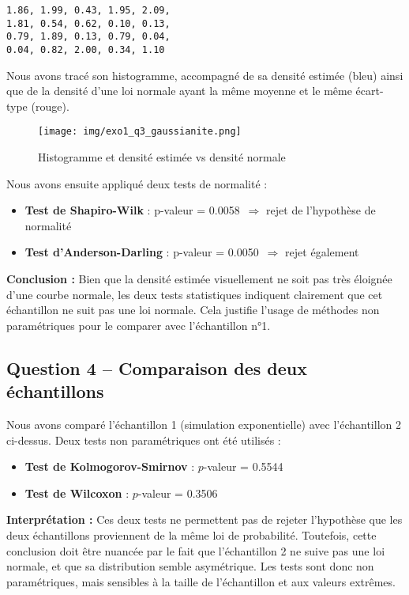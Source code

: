 \documentclass[a4paper,11pt]{article}
\begin{document}
\begin{verbatim}
1.86, 1.99, 0.43, 1.95, 2.09,
1.81, 0.54, 0.62, 0.10, 0.13,
0.79, 1.89, 0.13, 0.79, 0.04,
0.04, 0.82, 2.00, 0.34, 1.10
\end{verbatim}

Nous avons tracé son histogramme, accompagné de sa densité estimée (bleu) ainsi que de la densité d’une loi normale ayant la même moyenne et le même écart-type (rouge).

\begin{figure}[H]
    \centering
    \texttt{[image: img/exo1\_q3\_gaussianite.png]}
    \caption{Histogramme et densité estimée vs densité normale}
\end{figure}

Nous avons ensuite appliqué deux tests de normalité :
\begin{itemize}
    \item \textbf{Test de Shapiro-Wilk} : p-valeur = 0.0058~$\Rightarrow$ rejet de l’hypothèse de normalité
    \item \textbf{Test d’Anderson-Darling} : p-valeur = 0.0050~$\Rightarrow$ rejet également
\end{itemize}

\textbf{Conclusion :} Bien que la densité estimée visuellement ne soit pas très éloignée d’une courbe normale, les deux tests statistiques indiquent clairement que cet échantillon ne suit pas une loi normale. Cela justifie l’usage de méthodes non paramétriques pour le comparer avec l’échantillon n°1.

\subsection*{Question 4 – Comparaison des deux échantillons}
Nous avons comparé l’échantillon 1 (simulation exponentielle) avec l’échantillon 2 ci-dessus. Deux tests non paramétriques ont été utilisés :
\begin{itemize}
    \item \textbf{Test de Kolmogorov-Smirnov} : $p$-valeur = 0.5544
    \item \textbf{Test de Wilcoxon} : $p$-valeur = 0.3506
\end{itemize}

\textbf{Interprétation :} Ces deux tests ne permettent pas de rejeter l’hypothèse que les deux échantillons proviennent de la même loi de probabilité. Toutefois, cette conclusion doit être nuancée par le fait que l’échantillon 2 ne suive pas une loi normale, et que sa distribution semble asymétrique. Les tests sont donc non paramétriques, mais sensibles à la taille de l’échantillon et aux valeurs extrêmes.
\end{document}
